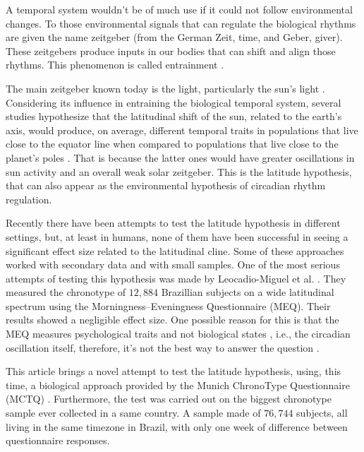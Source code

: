 \documentclass[
12pt,
openright,
oneside,
a4paper,
chapter=TITLE,
section=TITLE,
french,
spanish,
brazil,
english
]{abntex2}\usepackage{array}
\begin{document}
A temporal system wouldn't be of much use if it could not follow
environmental changes. To those environmental signals that can regulate
the biological rhythms are given the name zeitgeber (from the German
Zeit, time, and Geber, giver). These zeitgebers produce inputs in our
bodies that can shift and align those rhythms. This phenomenon is called
entrainment \autocite{roenneberg2003a,roenneberg2010}.

The main zeitgeber known today is the light, particularly the sun's
light \autocite{khalsa2003,minors1991,roenneberg2007a}. Considering its
influence in entraining the biological temporal system, several studies
hypothesize that the latitudinal shift of the sun, related to the
earth's axis, would produce, on average, different temporal traits in
populations that live close to the equator line when compared to
populations that live close to the planet's poles
\autocite{horzum2015,hut2013,leocadio-miguel2017,leocadio-miguel2014,pittendrigh1991,randler2017}.
That is because the latter ones would have greater oscillations in sun
activity and an overall weak solar zeitgeber. This is the latitude
hypothesis, that can also appear as the environmental hypothesis of
circadian rhythm regulation.

Recently there have been attempts to test the latitude hypothesis in
different settings, but, at least in humans, none of them have been
successful in seeing a significant effect size related to the
latitudinal cline. Some of these approaches worked with secondary data
and with small samples. One of the most serious attempts of testing this
hypothesis was made by Leocadio-Miguel et al.
\autocite*{leocadio-miguel2017}. They measured the chronotype of
\(12,884\) Brazillian subjects on a wide latitudinal spectrum using the
Morningness--Eveningness Questionnaire (MEQ). Their results showed a
negligible effect size. One possible reason for this is that the MEQ
measures psychological traits and not biological states
\autocite{roenneberg2019}, i.e., the circadian oscillation itself,
therefore, it's not the best way to answer the question
\autocite{leocadio-miguel2014}.

This article brings a novel attempt to test the latitude hypothesis,
using, this time, a biological approach provided by the Munich
ChronoType Questionnaire (MCTQ) \autocite{roenneberg2003}. Furthermore,
the test was carried out on the biggest chronotype sample ever collected
in a same country. A sample made of \(76,744\) subjects, all living in
the same timezone in Brazil, with only one week of difference between
questionnaire responses.
\end{document}
